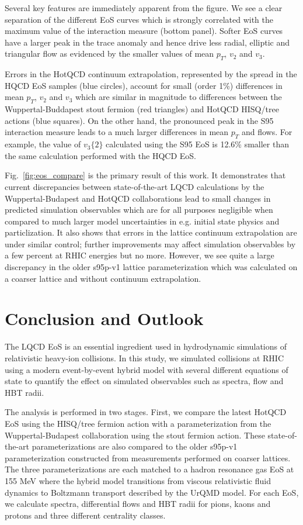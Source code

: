 \documentclass[aps,prc,reprint,amsmath,nofootinbib,superscriptaddress]{revtex4-1}
\begin{document}
Several key features are immediately apparent from the figure. We see a clear separation of the different EoS curves which is strongly correlated with the maximum value of the interaction measure (bottom panel). Softer EoS curves have a larger peak in the trace anomaly and hence drive less radial, elliptic and triangular flow as evidenced by the smaller values of 
mean $p_T$, $v_2$ and $v_3$.

Errors in the HotQCD continuum extrapolation, represented by the spread in the HQCD EoS samples (blue circles), account for small (order 1\%) differences in mean $p_T$, $v_2$ and $v_3$ which are similar in magnitude to differences between the Wuppertal-Buddapest stout fermion (red triangles) and HotQCD HISQ/tree actions (blue squares). On the other hand, the pronounced peak in the S95 interaction measure leads to a much larger differences in mean $p_T$ and flows. For example, the value of $v_3\{2\}$ calculated using the S95 EoS is 12.6\% smaller than the same calculation performed with the HQCD EoS.

Fig.~\ref{fig:eos_compare} is the primary result of this work. It demonstrates that current discrepancies between state-of-the-art LQCD calculations by the Wuppertal-Budapest and HotQCD collaborations lead to small changes in predicted simulation observables which are for all purposes negligible when compared to much larger model uncertainties in e.g. initial state physics and particlization. It also shows that errors in the lattice continuum extrapolation are under similar control; further improvements may affect simulation observables by a few percent at RHIC energies but no more. However, we see quite a large discrepancy in the older s95p-v1 lattice parameterization which was calculated on a coarser lattice and without continuum extrapolation.


\section{Conclusion and Outlook}
\label{conclusion}

The LQCD EoS is an essential ingredient used in hydrodynamic simulations of relativistic heavy-ion collisions. In this study, we simulated collisions at RHIC using a modern event-by-event hybrid model with several different equations of state to quantify the effect on simulated observables such as spectra, flow and HBT radii. 

The analysis is performed in two stages. First, we compare the latest HotQCD EoS using the HISQ/tree fermion action with a parameterization from the Wuppertal-Budapest collaboration using the stout fermion action. These state-of-the-art parameterizations are also compared to the older s95p-v1 parameterization constructed from measurements performed on coarser lattices. The three parameterizations are each matched to a hadron resonance gas EoS at 155 MeV where the hybrid model transitions from viscous relativistic fluid dynamics to Boltzmann transport described by the UrQMD model. For each EoS, we calculate spectra, differential flows and HBT radii for pions, kaons and protons and three different centrality classes.
\end{document}
